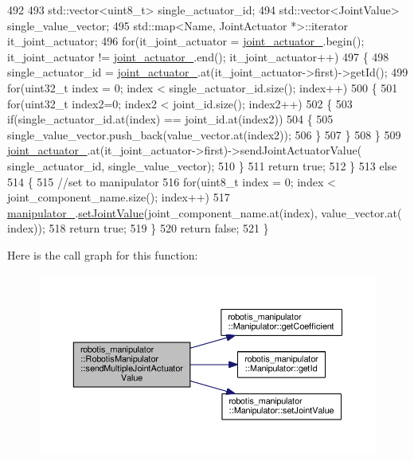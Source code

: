 \begin{DoxyCode}
492 
493     std::vector<uint8\_t> single\_actuator\_id;
494     std::vector<JointValue> single\_value\_vector;
495     std::map<Name, JointActuator *>::iterator it\_joint\_actuator;
496     \textcolor{keywordflow}{for}(it\_joint\_actuator = \hyperlink{classrobotis__manipulator_1_1_robotis_manipulator_a54dfb941bb2682d321daea25a373ab1c}{joint\_actuator\_}.begin(); it\_joint\_actuator != 
      \hyperlink{classrobotis__manipulator_1_1_robotis_manipulator_a54dfb941bb2682d321daea25a373ab1c}{joint\_actuator\_}.end(); it\_joint\_actuator++)
497     \{
498       single\_actuator\_id = \hyperlink{classrobotis__manipulator_1_1_robotis_manipulator_a54dfb941bb2682d321daea25a373ab1c}{joint\_actuator\_}.at(it\_joint\_actuator->first)->getId();
499       \textcolor{keywordflow}{for}(uint32\_t index = 0; index < single\_actuator\_id.size(); index++)
500       \{
501         \textcolor{keywordflow}{for}(uint32\_t index2=0; index2 < joint\_id.size(); index2++)
502         \{
503            \textcolor{keywordflow}{if}(single\_actuator\_id.at(index) == joint\_id.at(index2))
504            \{
505              single\_value\_vector.push\_back(value\_vector.at(index2));
506            \}
507         \}
508       \}
509       \hyperlink{classrobotis__manipulator_1_1_robotis_manipulator_a54dfb941bb2682d321daea25a373ab1c}{joint\_actuator\_}.at(it\_joint\_actuator->first)->sendJointActuatorValue(
      single\_actuator\_id, single\_value\_vector);
510     \}
511     \textcolor{keywordflow}{return} \textcolor{keyword}{true};
512   \}
513   \textcolor{keywordflow}{else}
514   \{
515     \textcolor{comment}{//set to manipulator}
516     \textcolor{keywordflow}{for}(uint8\_t index = 0; index < joint\_component\_name.size(); index++)
517       \hyperlink{classrobotis__manipulator_1_1_robotis_manipulator_a5b2df4a3b3ee7f408cb1d0eaf61644dc}{manipulator\_}.\hyperlink{classrobotis__manipulator_1_1_manipulator_aa740b17551040520851ec8dc1d619bfe}{setJointValue}(joint\_component\_name.at(index), value\_vector.at(
      index));
518     \textcolor{keywordflow}{return} \textcolor{keyword}{true};
519   \}
520   \textcolor{keywordflow}{return} \textcolor{keyword}{false};
521 \}
\end{DoxyCode}


Here is the call graph for this function\+:\nopagebreak
\begin{figure}[H]
\begin{center}
\leavevmode
\includegraphics[width=350pt]{classrobotis__manipulator_1_1_robotis_manipulator_ad90298397a0c6f9ffa5aa20cce0ab7e2_cgraph}
\end{center}
\end{figure}


